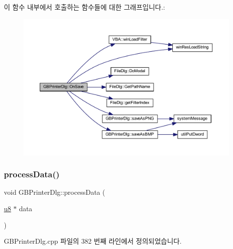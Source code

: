 이 함수 내부에서 호출하는 함수들에 대한 그래프입니다.\+:
\nopagebreak
\begin{figure}[H]
\begin{center}
\leavevmode
\includegraphics[width=350pt]{class_g_b_printer_dlg_a3cfa1c22a60df868b53c9e9d52094963_cgraph}
\end{center}
\end{figure}
\mbox{\label{class_g_b_printer_dlg_a9dcd976e6386374b0f2c70af0b09a43e}} 
\subsubsection{\texorpdfstring{process\+Data()}{processData()}}
{\footnotesize\ttfamily void G\+B\+Printer\+Dlg\+::process\+Data (\begin{DoxyParamCaption}\item[{\mbox{\hyperlink{_system_8h_aed742c436da53c1080638ce6ef7d13de}{u8}} $\ast$}]{data }\end{DoxyParamCaption})}



G\+B\+Printer\+Dlg.\+cpp 파일의 382 번째 라인에서 정의되었습니다.


